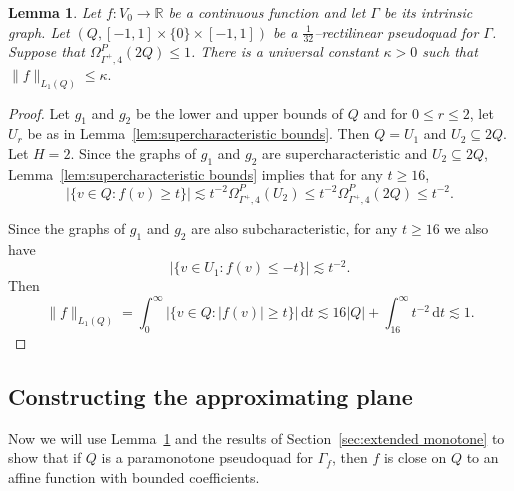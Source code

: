 \documentclass[11pt,reqno]{amsart}
\newcommand{\R}{\mathbb{R}}
\newcommand{\ud}[0]{\,\mathrm{d}}
\newcommand{\0}{\mathbf{0}}
\renewcommand{\1}{\mathbf 1}
\newcommand{\from}{\colon}
\renewcommand{\mid}{:}
\renewcommand{\subset}{\subseteq}
\renewcommand{\ge}{\geqslant}
\renewcommand{\le}{\leqslant}
\newtheorem{lemma}[thm]{Lemma}
\theoremstyle{remark}
\begin{document}
\begin{lemma}\label{lem:paramonotone is L1 bounded}
  Let $f\from V_0\to \R$ be a continuous function and let $\Gamma$ be its intrinsic graph.  Let $(Q, [-1,1]\times \{0\}\times [-1,1])$ be a $\frac{1}{32}$--rectilinear pseudoquad for $\Gamma$. Suppose that $\Omega^P_{\Gamma^+,4}(2Q)\le 1$.  There is a universal constant $\kappa>0$ such that $\|f\|_{L_1(Q)}\le \kappa.$
\end{lemma}
\begin{proof}
  Let $g_1$ and $g_2$ be the lower and upper bounds of $Q$ and for $0\le r\le 2$, let $U_r$ be as in Lemma~\ref{lem:supercharacteristic bounds}.  Then $Q=U_1$ and $U_2\subset 2Q$.  Let $H=2$.  Since the graphs of $g_1$ and $g_2$ are supercharacteristic and $U_2\subset 2Q$, Lemma~\ref{lem:supercharacteristic bounds} implies that  for any $t\ge 16$,
  $$|\{v\in Q\mid f(v)\ge t\}| \lesssim t^{-2} \Omega^P_{\Gamma^+,4}(U_2)\le t^{-2} \Omega^P_{\Gamma^+,4}(2Q)\le t^{-2}.$$


  Since the graphs of $g_1$ and $g_2$ are also subcharacteristic, for any $t\ge 16$ we also have
  $$|\{v\in U_1\mid f(v)\le -t\}| \lesssim t^{-2}.$$
   Then
  \begin{equation*}\|f\|_{L_1(Q)}=\int_0^\infty |\{v\in Q\mid |f(v)|\ge t\}|\ud t\lesssim 16 |Q|+\int_{16}^\infty t^{-2}\ud t \lesssim 1.\tag*{\qedhere}\end{equation*}
\end{proof}
\subsection{Constructing the approximating plane}

Now we will use Lemma~\ref{lem:paramonotone is L1 bounded} and the results of Section~\ref{sec:extended monotone} to show that if $Q$ is a paramonotone pseudoquad for $\Gamma_f$, then $f$ is close on $Q$ to an affine function with bounded coefficients.
\end{document}
